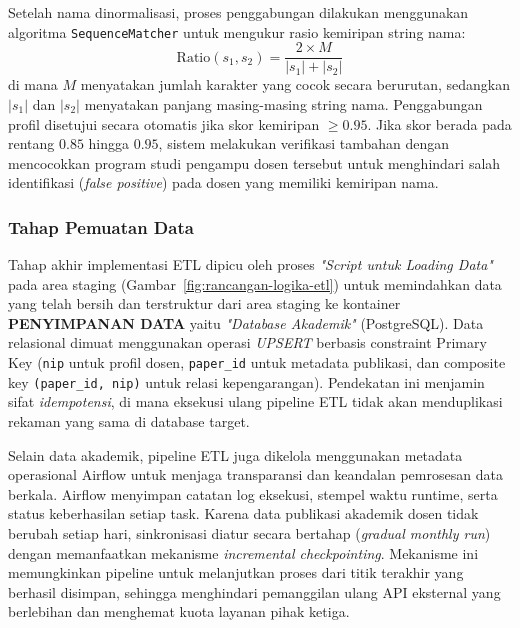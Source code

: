 \documentclass{rapidsart}
\theoremstyle{plain}
\theoremstyle{remark}
\theoremstyle{definition}
\begin{document}
\begin{sloppypar}
\begin{enumerate}
              Setelah nama dinormalisasi, proses penggabungan dilakukan menggunakan algoritma \texttt{SequenceMatcher} \citep{christen2012data} untuk mengukur rasio kemiripan string nama:
              \begin{equation}
                  \text{Ratio}(s_1, s_2) = \frac{2 \times M}{|s_1| + |s_2|}
                  \label{eq:string-ratio}
              \end{equation}
              di mana $M$ menyatakan jumlah karakter yang cocok secara berurutan, sedangkan $|s_1|$ dan $|s_2|$ menyatakan panjang masing-masing string nama. Penggabungan profil disetujui secara otomatis jika skor kemiripan $\ge 0.95$. Jika skor berada pada rentang $0.85$ hingga $0.95$, sistem melakukan verifikasi tambahan dengan mencocokkan program studi pengampu dosen tersebut untuk menghindari salah identifikasi (\textit{false positive}) pada dosen yang memiliki kemiripan nama.
    \end{enumerate}

    \subsubsection{Tahap Pemuatan Data}
    Tahap akhir implementasi ETL dipicu oleh proses \textit{"Script untuk Loading Data"} pada area staging (Gambar~\ref{fig:rancangan-logika-etl}) untuk memindahkan data yang telah bersih dan terstruktur dari area staging ke kontainer \textbf{PENYIMPANAN DATA} yaitu \textit{"Database Akademik"} (PostgreSQL). Data relasional dimuat menggunakan operasi \textit{UPSERT} berbasis constraint Primary Key (\texttt{nip} untuk profil dosen, \texttt{paper\_id} untuk metadata publikasi, dan composite key \texttt{(paper\_id, nip)} untuk relasi kepengarangan). Pendekatan ini menjamin sifat \textit{idempotensi}, di mana eksekusi ulang pipeline ETL tidak akan menduplikasi rekaman yang sama di database target.

    Selain data akademik, pipeline ETL juga dikelola menggunakan metadata operasional Airflow untuk menjaga transparansi dan keandalan pemrosesan data berkala. Airflow menyimpan catatan log eksekusi, stempel waktu runtime, serta status keberhasilan setiap task. Karena data publikasi akademik dosen tidak berubah setiap hari, sinkronisasi diatur secara bertahap (\textit{gradual monthly run}) dengan memanfaatkan mekanisme \textit{incremental checkpointing}. Mekanisme ini memungkinkan pipeline untuk melanjutkan proses dari titik terakhir yang berhasil disimpan, sehingga menghindari pemanggilan ulang API eksternal yang berlebihan dan menghemat kuota layanan pihak ketiga.


\end{sloppypar}
\end{document}

